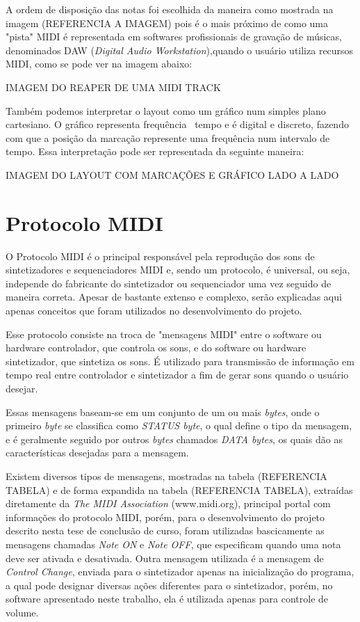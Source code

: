 \documentclass[12pt]{report}
\begin{document}
A ordem de disposição das notas foi escolhida da maneira como mostrada na imagem (REFERENCIA A IMAGEM) pois é o mais próximo de como uma "pista" MIDI é representada em softwares profissionais de gravação de músicas, denominados DAW ({\it Digital Audio Workstation}),quando o usuário utiliza recursos MIDI, como se pode ver na imagem abaixo:

IMAGEM DO REAPER DE UMA MIDI TRACK

Também podemos interpretar o layout como um gráfico num simples plano cartesiano. O gráfico representa frequência \times\ tempo e é digital e discreto, fazendo com que a posição da marcação represente uma frequência num intervalo de tempo. Essa interpretação pode ser representada da seguinte maneira:

IMAGEM DO LAYOUT COM MARCAÇÕES E GRÁFICO LADO A LADO

\chapter{Protocolo MIDI}
\label{cha:fund-teor}

O Protocolo MIDI é o principal responsável pela reprodução dos sons de sintetizadores e sequenciadores MIDI e, sendo um protocolo, é universal, ou seja, independe do fabricante do sintetizador ou sequenciador uma vez seguido de maneira correta. Apesar de bastante extenso e complexo, serão explicadas aqui apenas conceitos que foram utilizados no desenvolvimento do projeto.

Esse protocolo consiste na troca de "mensagens MIDI" entre o software ou hardware controlador, que controla os sons, e do software ou hardware sintetizador, que sintetiza os sons. É utilizado para transmissão de informação em tempo real entre controlador e sintetizador a fim de gerar sons quando o usuário desejar.

Essas mensagens baseam-se em um conjunto de um ou mais {\it bytes}, onde o primeiro {\it byte} se classifica como {\it STATUS byte}, o qual define o tipo da mensagem, e é geralmente seguido por outros {\it bytes} chamados {\it DATA bytes}, os quais dão as características desejadas para a mensagem.

Existem diversos tipos de mensagens, mostradas na tabela (REFERENCIA TABELA) e de forma expandida na tabela (REFERENCIA TABELA), extraídas diretamente da {\it The MIDI Association} (www.midi.org), principal portal com informações do protocolo MIDI, porém, para o desenvolvimento do projeto descrito nesta tese de conclusão de curso, foram utilizadas bascicamente as mensagens chamadas {\it Note ON} e {\it Note OFF}, que especificam quando uma nota deve ser ativada e desativada. Outra mensagem utilizada é a mensagem de {\it Control Change}, enviada para o sintetizador apenas na inicialização do programa, a qual pode designar diversas ações diferentes para o sintetizador, porém, no software apresentado neste trabalho, ela é utilizada apenas para controle de volume.
\end{document}
